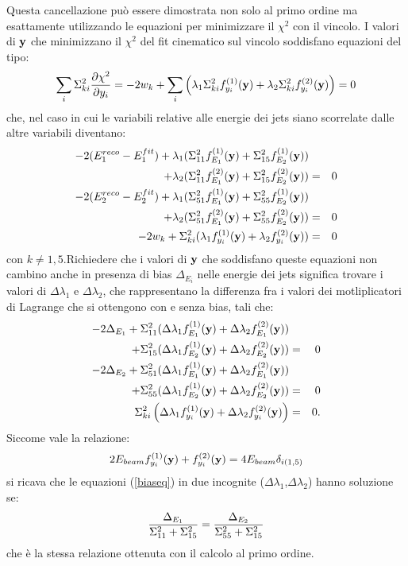 Questa cancellazione pu\`o essere dimostrata non solo al primo ordine ma esattamente
utilizzando le equazioni per minimizzare il $\chi^2$ con il vincolo.
I valori di ${\bf y}$ che minimizzano il $\chi^2$ del fit cinematico sul vincolo
soddisfano equazioni del tipo:
\[\sum_i\Sigma^2_{ki}\frac{\partial\chi^2}{\partial y_i}=-2w_k+\sum_i\left(\lambda_1\Sigma^2_{ki}f^{(1)}_{y_i}({\bf y})+      \lambda_2\Sigma^2_{ki}f^{(2)}_{y_i}({\bf y})\right)=0\]
che, nel caso in cui le variabili relative alle energie dei jets siano scorrelate
dalle altre variabili diventano:
\begin{eqnarray*}
-2(E^{reco}_1-E^{fit}_1)+\lambda_1(\Sigma^2_{11}f^{(1)}_{E_1}({\bf y})                                  +\Sigma^2_{15}f^{(1)}_{E_2}({\bf y}))\\
+\lambda_2(\Sigma^2_{11}f^{(2)}_{E_1}({\bf y})+\Sigma^2_{15}f^{(2)}_{E_2}({\bf y}))&=&0\\
-2(E^{reco}_2-E^{fit}_2)+\lambda_1(\Sigma^2_{51}f^{(1)}_{E_1}({\bf y})                                  +\Sigma^2_{55}f^{(1)}_{E_2}({\bf y}))\\
+\lambda_2(\Sigma^2_{51}f^{(2)}_{E_1}({\bf y})+\Sigma^2_{55}f^{(2)}_{E_2}({\bf y}))&=&0\\
-2w_k+\Sigma^2_{ki}(\lambda_1f^{(1)}_{y_i}({\bf y})+\lambda_2f^{(2)}_{y_i}({\bf y}))&=&0 
\end{eqnarray*}
con $k\neq 1,5$.Richiedere che i valori di ${\bf y}$ che soddisfano queste equazioni non cambino anche in presenza di bias $\Delta_{E_i}$ nelle energie dei jets significa trovare i valori
di $\Delta\lambda_1$ e $\Delta\lambda_2$, che rappresentano la differenza fra i valori dei motliplicatori di Lagrange che si ottengono con e senza bias, tali che:
\begin{eqnarray}
\label{biaseq}
-2\Delta_{E_1}+\Sigma^2_{11}(\Delta\lambda_1f^{(1)}_{E_1}({\bf y})                         +\Delta\lambda_2f^{(2)}_{E_1}({\bf y}))&&\nonumber\\
+\Sigma^2_{15}(\Delta\lambda_1f^{(1)}_{E_2}({\bf y})              +\Delta\lambda_2f^{(2)}_{E_2}({\bf y}))&=&0\nonumber\\
-2\Delta_{E_2}+\Sigma^2_{51}(\Delta\lambda_1f^{(1)}_{E_1}({\bf y})                         +\Delta\lambda_2f^{(2)}_{E_1}({\bf y}))&&\nonumber\\
+\Sigma^2_{55}(\Delta\lambda_1f^{(1)}_{E_2}({\bf y})              +\Delta\lambda_2f^{(2)}_{E_2}({\bf y}))&=&0\nonumber\\
\Sigma^2_{ki}\left(\Delta\lambda_1f^{(1)}_{y_i}({\bf y})               +\Delta\lambda_2f^{(2)}_{y_i}({\bf y})\right)&=&0.
\end{eqnarray}
Siccome vale la relazione:\[2E_{beam}f^{(1)}_{y_i}({\bf y})+f^{(2)}_{y_i}({\bf y})=4E_{beam}\delta_{i(1,5)}\]
si ricava che le equazioni (\ref{biaseq}) in due incognite ($\Delta\lambda_1$,$\Delta\lambda_2$) hanno soluzione se:\[\frac{\Delta_{E_1}}{\Sigma^2_{11}+\Sigma^2_{15}}=\frac{\Delta_{E_2}}{\Sigma^2_{55}+\Sigma^2_{15}}\]
che \`e la stessa relazione ottenuta con il calcolo al primo ordine.\\
%
